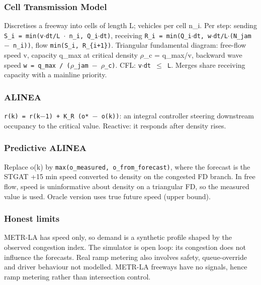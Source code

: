 \documentclass[10pt,a4paper]{article}
\begin{document}
\subsubsection*{Cell Transmission Model}
Discretises a freeway into cells of length L; vehicles per cell n\_\allowbreak{}i. Per step: sending \texttt{S\_\allowbreak{}i = min(v\ensuremath{\cdot}dt/\allowbreak{}L \ensuremath{\cdot} n\_\allowbreak{}i, Q\_\allowbreak{}i\ensuremath{\cdot}dt)}, receiving \texttt{R\_\allowbreak{}i = min(Q\_\allowbreak{}i\ensuremath{\cdot}dt, w\ensuremath{\cdot}dt/\allowbreak{}L\ensuremath{\cdot}(N\_\allowbreak{}jam \ensuremath{-} n\_\allowbreak{}i))}, flow \texttt{min(S\_\allowbreak{}i, R\_\allowbreak{}\{i+1\})}. Triangular fundamental diagram: free-flow speed v, capacity q\_\allowbreak{}max at critical density \ensuremath{\rho}\_\allowbreak{}c = q\_\allowbreak{}max/\allowbreak{}v, backward wave speed \texttt{w = q\_\allowbreak{}max /\allowbreak{} (\ensuremath{\rho}\_\allowbreak{}jam \ensuremath{-} \ensuremath{\rho}\_\allowbreak{}c)}. CFL: \texttt{v\ensuremath{\cdot}dt \ensuremath{\leq} L}. Merges share receiving capacity with a mainline priority.

\subsubsection*{ALINEA}
\texttt{r(k) = r(k\ensuremath{-}1) + K\_\allowbreak{}R (o* \ensuremath{-} o(k))}: an integral controller steering downstream occupancy to the critical value. Reactive: it responds after density rises.

\subsubsection*{Predictive ALINEA}
Replace o(k) by \texttt{max(o\_\allowbreak{}measured, o\_\allowbreak{}from\_\allowbreak{}forecast)}, where the forecast is the STGAT +15 min speed converted to density on the congested FD branch. In free flow, speed is uninformative about density on a triangular FD, so the measured value is used. Oracle version uses true future speed (upper bound).

\subsubsection*{Honest limits}
METR-LA has speed only, so demand is a synthetic profile shaped by the observed congestion index. The simulator is open loop: its congestion does not influence the forecasts. Real ramp metering also involves safety, queue-override and driver behaviour not modelled. METR-LA freeways have no signals, hence ramp metering rather than intersection control.
\end{document}

